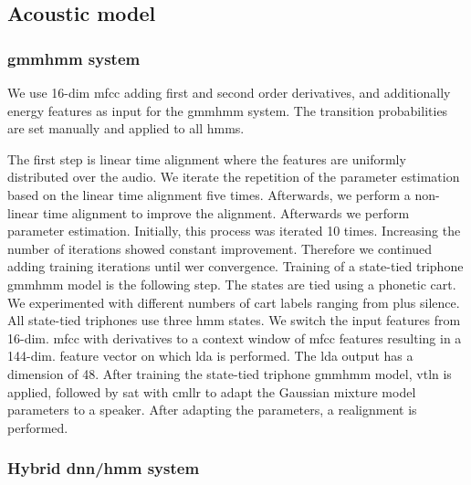 \documentclass[a4paper]{article}
\begin{document}
\subsection{Acoustic model}
\label{sec:am}

\subsubsection{\Ac{gmmhmm} system}

We use 16-dim \ac{mfcc} adding first and second order derivatives, and additionally energy features as input for the \ac{gmmhmm} system.
The transition probabilities are set manually and applied to all \acp{hmm}.

The first step is linear time alignment where the features are uniformly distributed over the audio.
We iterate the repetition of the parameter estimation based on the linear time alignment five times.
Afterwards, we perform a non-linear time alignment to improve the alignment.
Afterwards we perform parameter estimation.
Initially, this process was iterated 10 times.
Increasing the number of iterations showed constant improvement.
Therefore we continued adding training iterations until \ac{wer} convergence.
Training of a state-tied triphone \ac{gmmhmm} model is the following step.
The states are tied using a phonetic \ac{cart}.
We experimented with different numbers of \ac{cart} labels ranging from  plus silence.
All state-tied triphones use three \ac{hmm} states.
We switch the input features from 16-dim. \ac{mfcc} with derivatives to a context window of \ac{mfcc} features resulting in a 144-dim. feature vector on which \ac{lda} is performed.
The \ac{lda} output has a dimension of 48.
After training the state-tied triphone \ac{gmmhmm} model, \ac{vtln} is applied, followed by \ac{sat} with \acl*{cmllr} to adapt the Gaussian mixture model parameters to a speaker.
After adapting the parameters, a realignment is performed.

\subsubsection{Hybrid \ac{dnn}/\ac{hmm} system}
\end{document}
